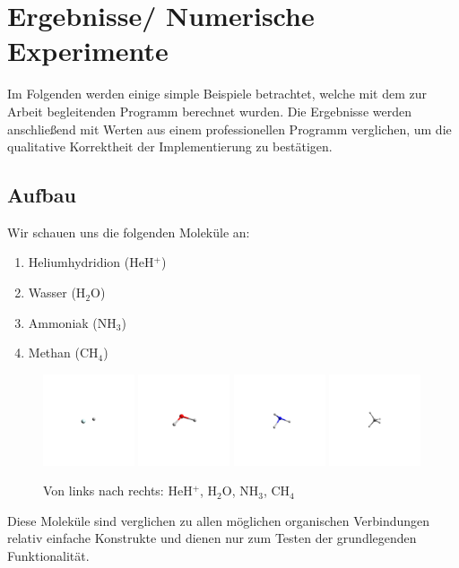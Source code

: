 \chapter{Ergebnisse/ Numerische Experimente}
Im Folgenden werden einige simple Beispiele betrachtet,
welche mit dem zur Arbeit begleitenden Programm berechnet wurden.
Die Ergebnisse werden anschließend mit Werten aus
einem professionellen Programm verglichen,
um die qualitative Korrektheit der Implementierung zu bestätigen.
\section{Aufbau}
Wir schauen uns die folgenden Moleküle an:
\begin{enumerate}
    \item Heliumhydridion (HeH$^+$)
    \item Wasser (H$_2$O)
    \item Ammoniak (NH$_3$)
    \item Methan (CH$_4$)
\end{enumerate}
\begin{figure}[h]
    \centering
\includegraphics[trim=1400 1400 1400 1400, clip, width=0.24\textwidth]{res/HeH/heh_w.png}
\includegraphics[trim=1400 1400 1400 1400, clip, width=0.24\textwidth]{res/H2O/h2o.png}
\includegraphics[trim=1400 1400 1400 1400, clip, width=0.24\textwidth]{res/NH3/nh3_d.png}
\includegraphics[trim=1400 1400 1400 1400, clip, width=0.24\textwidth]{res/CH4/ch4.png}
\caption{Von links nach rechts: HeH$^+$, H$_2$O, NH$_3$, CH$_4$}\label{molecules}
\end{figure}
Diese Moleküle sind verglichen zu
allen möglichen organischen Verbindungen
relativ einfache Konstrukte und dienen nur zum Testen
der grundlegenden Funktionalität.

